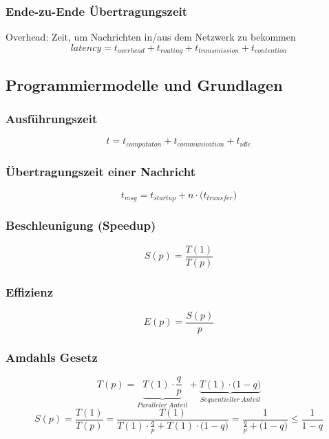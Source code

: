 \subsubsection{Ende-zu-Ende Übertragungszeit}
Overhead: Zeit, um Nachrichten in/aus dem Netzwerk zu bekommen
\begin{equation}
	latency = t_{overhead} + t_{routing} + t_{transmission} + t_{contention}
\end{equation}


\subsection{Programmiermodelle und Grundlagen}

\subsubsection{Ausführungszeit}
\begin{equation}
	t = t_{computaton} + t_{communication} + t_{idle}
\end{equation}

\subsubsection{Übertragungszeit einer Nachricht}
\begin{equation}
	t_{msg} = t_{startup} + n \cdot \big( t_{transfer} \big)
\end{equation}

\subsubsection{Beschleunigung (Speedup)}
\begin{equation}
	S(p) = \frac{T(1)}{T(p)}
\end{equation}

\subsubsection{Effizienz}
\begin{equation}
	E(p) = \frac{S(p)}{p}
\end{equation}

\subsubsection{Amdahls Gesetz}
\begin{equation}
	T(p) = \underbrace{T(1) \cdot \frac{q}{p}}_{Paralleler~Anteil} + \underbrace{T(1) \cdot \big(1-q\big)}_{Sequentieller~Anteil}
\end{equation}
\begin{equation}
	S(p) = \frac{T(1)}{T(p)} = \frac{T(1)}{T(1) \cdot \frac{q}{p} + T(1) \cdot \big(1-q\big)} = \frac{1}{\frac{q}{p} + \big( 1 - q \big)} \le \frac{1}{1-q}
\end{equation}